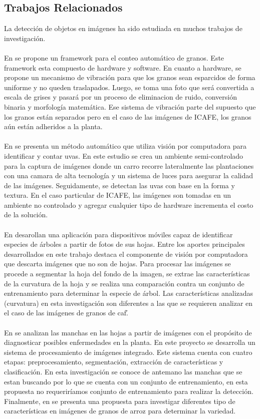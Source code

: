 \subsection{Trabajos Relacionados}\label{trabajos_relacionados}
La detecci\'on de objetos en im\'agenes ha sido estudiada en muchos trabajos de investigaci\'on.
\\\\
En \cite{wangwangji} se propone un framework para el conteo autom\'atico de granos. Este framework esta compuesto de hardware y software. En cuanto a hardware, se propone un mecanismo de vibraci\'on para que los granos sean esparcidos de forma uniforme y no queden traslapados. Luego, se toma una foto que ser\'a convertida a escala de grises y pasar\'a por un proceso de eliminacion de ruido, conversi\'on binaria y morfolog\'ia matem\'atica. Ese sistema de vibraci\'on parte del supuesto que los granos est\'an separados pero en el caso de las im\'agenes de ICAFE, los granos a\'un est\'an adheridos a la planta.
\\\\
En \cite{nuske} se presenta un m\'etodo autom\'atico que utiliza visi\'on por computadora para identificar y contar uvas. En este estudio se crea un ambiente semi-controlado para la captura de im\'agenes donde un carro recorre lateralmente las plantaciones con una camara de alta tecnolog\'ia y un sistema de luces para asegurar la calidad de las im\'agenes. Seguidamente, se detectan las uvas con base en la forma y textura. En el caso particular de ICAFE, las im\'agenes son tomadas en un ambiente no controlado y agregar cualquier tipo de hardware incrementa el costo de la soluci\'on.
\\\\
En \cite{leafsnap} desarollan una aplicaci\'on para dispositivos m\'oviles capaz de identificar especies de \'arboles a partir de fotos de sus hojas. Entre los aportes principales desarrollados en este trabajo destaca el componente de visi\'on por computadora que descarta im\'agenes que no son de hojas. Para procesar las im\'agenes se procede a segmentar la hoja del fondo de la imagen, se extrae las caracter\'isticas de la curvatura de la hoja y se realiza una comparaci\'on contra un conjunto de entrenamiento para determinar la especie de \'arbol. Las caracter\'isticas analizadas (curvatura) en esta investigaci\'on son diferentes a las que se requieren analizar en el caso de las im\'agenes de granos de caf\'.
\\\\
En \cite{helly} se analizan las manchas en las hojas a partir de im\'agenes con el prop\'osito de diagnosticar posibles enfermedades en la planta. En este proyecto se desarrolla un sistema de procesamiento de im\'agenes integrado. Este sistema cuenta con cuatro etapas: preprocesamiento, segmentaci\'on, extracci\'on de caracter\'isticas y clasificaci\'on. En esta investigaci\'on se conoce de antemano las manchas que se estan buscando por lo que se cuenta con un conjunto de entrenamiento, en esta propuesta no requerir\'iamos conjunto de entrenamiento para realizar la detecci\'on. Finalmente, en \cite{periasamy} se presenta una propuesta para investigar diferentes tipo de caracter\'isticas en im\'agenes de granos de arroz para determinar la variedad.

